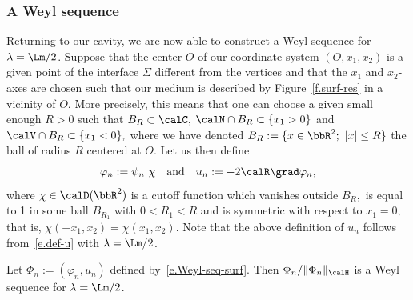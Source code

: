 \subsubsection{A Weyl sequence}
Returning to our cavity, we are now able to construct a Weyl sequence for\linebreak$\lambda = \Lm/2$. Suppose that the center $O$ of our coordinate system $(O,x_1,x_2)$ is a given point of the interface $\Sigma$ different from the vertices and that the $x_1$ and $x_2$-axes are chosen such that our medium is described by Figure~\ref{f.surf-res} in a vicinity of $O.$ More precisely, this means that one can choose a given small enough $R>0$ such that $B_R \subset \calC,$ $\calN \cap B_R \subset \{x_1 > 0\}$ and $\calV \cap B_R \subset \{x_1 < 0\},$ where we have denoted $B_R := \{ x \in \bbR^2;\ |x| \le R \}$ the ball of radius $R$ centered at $O.$ Let us then define
\begin{equation}\label{e.Weyl-seq-surf}
\varphi_n := \psi_n \ \chi
\quad\text{and}\quad u_n := -2 \calR \grad \varphi_n,
\end{equation}
where $\chi \in \calD(\bbR^2)$ is a cutoff function which vanishes outside $B_R,$ is equal to 1 in some ball $B_{R_1}$ with $0 < R_1 < R$ and is symmetric with respect to $x_1=0,$ that is, $\chi(-x_1,x_2) = \chi(x_1,x_2).$ Note that the above definition of $u_n$ follows from~\eqref{e.def-u} with $\lambda=\Lm/2$.

\begin{prop}\label{p-Weyl-surface}
Let $\Phi_n := (\varphi_n,u_n)$ defined by~\eqref{e.Weyl-seq-surf}. Then $\Phi_n/\|\Phi_n\|_\calH$ is a Weyl sequence for $\lambda = \Lm/2$.
\end{prop}

